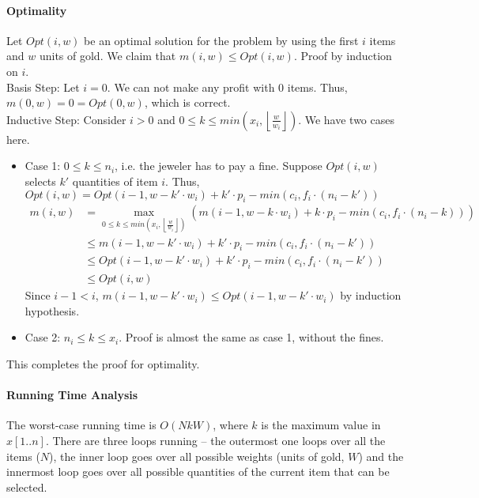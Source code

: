 \documentclass{article}
\begin{document}
\paragraph{Optimality}
Let $Opt(i, w)$ be an optimal solution for the problem by using the first $i$ items and $w$ units of gold. We claim that $m(i, w) \leq Opt(i, w)$. Proof by induction on $i$.\\
Basis Step: Let $i = 0$. We can not make any profit with 0 items. Thus, $m(0, w) = 0 = Opt(0, w)$, which is correct.\\
Inductive Step: Consider $i > 0$ and $0 \leq k \leq min\left(x_i, \left\lfloor\frac{w}{w_i}\right\rfloor\right)$. We have two cases here.
\begin{itemize}
	\item Case 1: $0 \leq k \leq n_i$, i.e. the jeweler has to pay a fine. Suppose $Opt(i, w)$ selects $k'$ quantities of item $i$. Thus, $Opt(i, w) = Opt(i-1, w-k' \cdot w_i) + k' \cdot p_i - min(c_i, f_i \cdot(n_i - k'))$
	\begin{align*}
	m(i, w) &= \max\limits_{0 \leq k \leq min\left(x_i, \left\lfloor\frac{w}{w_i}\right\rfloor\right)}(m(i-1, w-k \cdot w_i) + k \cdot p_i - min(c_i, f_i \cdot(n_i - k)))\\
	& \leq  m(i-1, w-k' \cdot w_i) + k' \cdot p_i - min(c_i, f_i \cdot(n_i - k'))\\
	& \leq Opt(i-1, w-k' \cdot w_i) + k' \cdot p_i - min(c_i, f_i \cdot(n_i - k'))\\
	& \leq Opt(i, w)
	\end{align*}
	Since $i-1 < i$, $m(i-1,w-k' \cdot w_i) \leq Opt(i-1,w-k' \cdot w_i)$ by induction hypothesis.
	
	\item Case 2: $n_i \leq k \leq x_i$. Proof is almost the same as case 1, without the fines.
\end{itemize}

This completes the proof for optimality.

\paragraph{Running Time Analysis}
The worst-case running time is $O(NkW)$, where $k$ is the maximum value in $x[1..n]$. There are three loops running -- the outermost one loops over all the items ($N$), the inner loop goes over all possible weights (units of gold, $W$) and the innermost loop goes over all possible quantities of the current item that can be selected.
\end{document}
